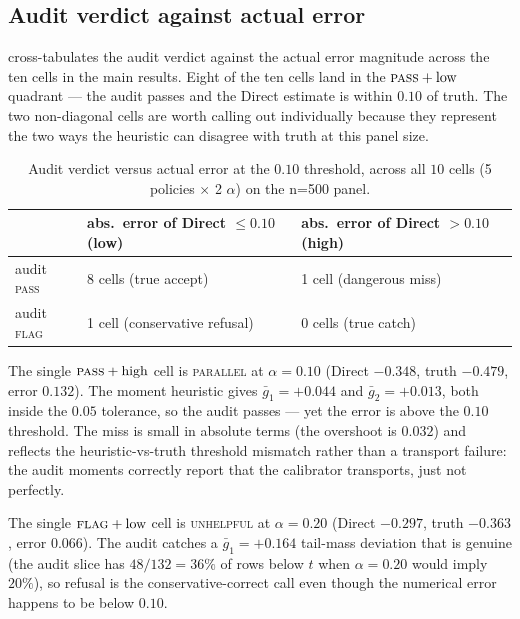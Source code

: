\documentclass[11pt]{article}
\begin{document}
\subsection{Audit verdict against actual error}
\label{app:audittruth}

 cross-tabulates the audit verdict against the
actual error magnitude across the ten cells in the main results. Eight
of the ten cells land in the $\textsc{pass}+\text{low}$ quadrant — the
audit passes and the Direct estimate is within $0.10$ of truth. The
two non-diagonal cells are worth calling out individually because they
represent the two ways the heuristic can disagree with truth at this
panel size.

\begin{table}[h]
\centering\small
\caption{Audit verdict versus actual error at the $0.10$ threshold,
across all $10$ cells (5 policies $\times$ 2 $\alpha$) on the n=500 panel.}
\label{tab:audittruth}
\begin{tabular}{l l l}
\toprule
& \thead{abs.\ error of Direct $\le 0.10$\\ (low)} & \thead{abs.\ error of Direct $> 0.10$\\ (high)} \\
\midrule
audit \textsc{pass} & 8 cells (true accept) & 1 cell (dangerous miss) \\
audit \textsc{flag} & 1 cell (conservative refusal) & 0 cells (true catch) \\
\bottomrule
\end{tabular}
\end{table}

The single $\textsc{pass}+\text{high}$ cell is \textsc{parallel} at
$\alpha = 0.10$ (Direct $-0.348$, truth $-0.479$, error $0.132$). The
moment heuristic gives $\bar g_1 = +0.044$ and $\bar g_2 = +0.013$, both
inside the $0.05$ tolerance, so the audit passes — yet the error is
above the $0.10$ threshold. The miss is small in absolute terms (the
overshoot is $0.032$) and reflects the heuristic-vs-truth threshold
mismatch rather than a transport failure: the audit moments correctly
report that the calibrator transports, just not perfectly.

The single $\textsc{flag}+\text{low}$ cell is \textsc{unhelpful} at
$\alpha = 0.20$ (Direct $-0.297$, truth $-0.363$, error $0.066$). The
audit catches a $\bar g_1 = +0.164$ tail-mass deviation that is
genuine (the audit slice has $48 / 132 = 36\%$ of rows below $\hat t$
when $\alpha = 0.20$ would imply $20\%$), so refusal is the
conservative-correct call even though the numerical error happens to
be below $0.10$.
\end{document}
